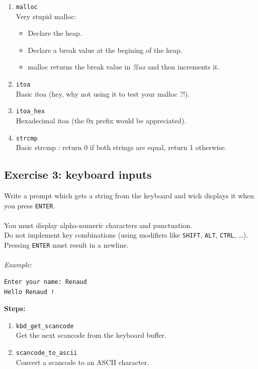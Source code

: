   \begin{enumerate}
  \item {\tt malloc}\\
  Very stupid malloc:
  \begin{itemize}
  \item Declare the heap.
  \item Declare a break value at the begining of the heap.
  \item malloc returns the break value in {\em \%ax} and then increments it.
  \end{itemize}
  \item {\tt itoa}\\
  Basic itoa (hey, why not using it to test your malloc ?!).
  \item {\tt itoa\_hex}\\
  Hexadecimal itoa (the 0x prefix would be appreciated).
  \item {\tt strcmp}\\
  Basic strcmp : return 0 if both strings are equal, return 1 otherwise.
  \end{enumerate}


\subsection*{Exercise 3: keyboard inputs}

Write a prompt which gets a string from the keyboard and wich displays it when you press {\tt ENTER}.\\
\\
You must display alpha-numeric characters and punctuation.\\
Do not implement key combinations (using modifiers like {\tt SHIFT}, {\tt ALT}, {\tt CTRL}, \ldots).\\
Pressing {\tt ENTER} must result in a newline.\\
\\
{\em Example}:
\begin{verbatim}
Enter your name: Renaud
Hello Renaud !
\end{verbatim}
{\bf Steps:}
  \begin{enumerate}
  \item {\tt kbd\_get\_scancode}\\
  Get the next scancode from the keyboard buffer.
  \item {\tt scancode\_to\_ascii}\\
  Convert a scancode to an ASCII character.
  \end{enumerate}



